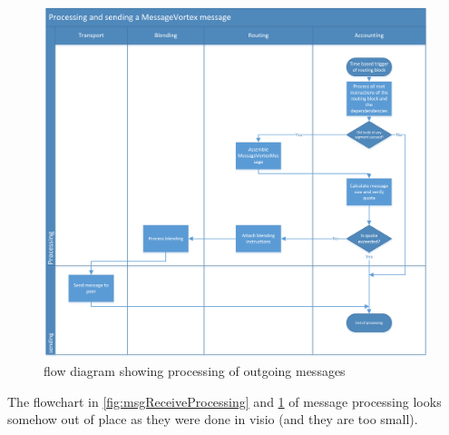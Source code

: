 \documentclass[11pt]{extarticle}
\begin{document}
 	\begin{figure}[H]
 		\centering
 		\includegraphics[height=0.40\textheight]{inc/flowchart_message_sending}
 		\caption{flow diagram showing processing of outgoing messages}
 		\label{fig:msgSendProcessing}
 	\end{figure}
	The flowchart in \cref{fig:msgReceiveProcessing} and \cref{fig:msgSendProcessing} of message processing looks somehow out of place as they were done in visio (and they are too small).
 	
 	
\end{document}
